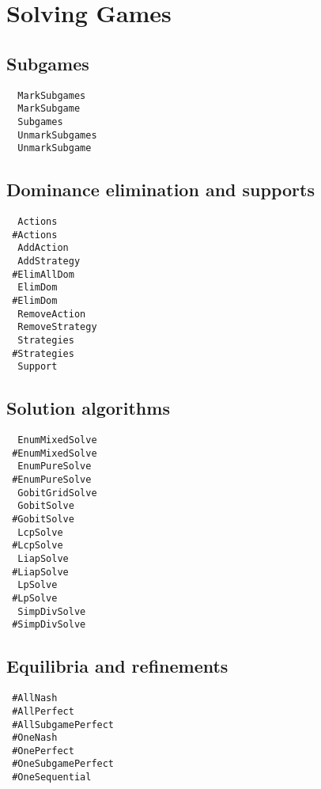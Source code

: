 \section{Solving Games}

\subsection{Subgames}

\begin{multicols}{3}
\begin{verbatim}
  MarkSubgames 
  MarkSubgame 
  Subgames 
  UnmarkSubgames 
  UnmarkSubgame 
\end{verbatim}
\end{multicols}

\subsection{Dominance elimination and supports}

\begin{multicols}{3}
\begin{verbatim}
  Actions
 #Actions
  AddAction
  AddStrategy
 #ElimAllDom 
  ElimDom 
 #ElimDom 
  RemoveAction
  RemoveStrategy
  Strategies 
 #Strategies 
  Support 
\end{verbatim}
\end{multicols}

\subsection{Solution algorithms}

\begin{multicols}{3}
\begin{verbatim}
  EnumMixedSolve 
 #EnumMixedSolve 
  EnumPureSolve 
 #EnumPureSolve 
  GobitGridSolve 
  GobitSolve 
 #GobitSolve 
  LcpSolve 
 #LcpSolve 
  LiapSolve 
 #LiapSolve 
  LpSolve 
 #LpSolve 
  SimpDivSolve 
 #SimpDivSolve 
\end{verbatim}
\end{multicols}

\subsection{Equilibria and refinements}

\begin{multicols}{3}
\begin{verbatim}
 #AllNash
 #AllPerfect
 #AllSubgamePerfect
 #OneNash
 #OnePerfect
 #OneSubgamePerfect
 #OneSequential
\end{verbatim}
\end{multicols}

